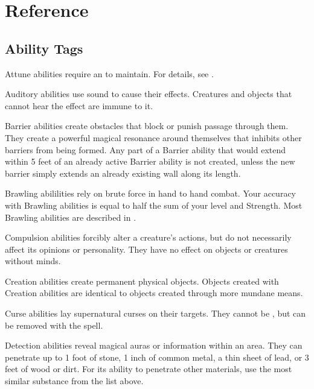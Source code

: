 \chapter{Reference}\label{Reference}

\section{Ability Tags}\label{Ability Tags}

     Attune abilities require an  to maintain.
    For details, see .

     Auditory abilities use sound to cause their effects.
    Creatures and objects that cannot hear the effect are immune to it.

     Barrier abilities create obstacles that block or punish passage through them.
    They create a powerful magical resonance around themselves that inhibits other barriers from being formed.
    Any part of a Barrier ability that would extend within 5 feet of an already active Barrier ability is not created, unless the new barrier simply extends an already existing wall along its length.

     Brawling abililities rely on brute force in hand to hand combat.
    Your accuracy with Brawling abilities is equal to half the sum of your level and Strength.
    Most Brawling abilities are described in .

     Compulsion abilities forcibly alter a creature's actions, but do not necessarily affect its opinions or personality.
    They have no effect on objects or creatures without minds.

     Creation abilities create permanent physical objects.
    Objects created with Creation abilities are identical to objects created through more mundane means.

     Curse abilities lay supernatural curses on their targets.
    They cannot be , but can be removed with the  spell.

    \label{Detection} Detection abilities reveal magical auras or information within an area.
    They can penetrate up to 1 foot of stone, 1 inch of common metal, a thin sheet of lead, or 3 feet of wood or dirt.
    For its ability to penetrate other materials, use the most similar substance from the list above.

